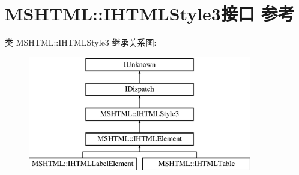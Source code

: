 \hypertarget{interface_m_s_h_t_m_l_1_1_i_h_t_m_l_style3}{}\section{M\+S\+H\+T\+ML\+:\+:I\+H\+T\+M\+L\+Style3接口 参考}
\label{interface_m_s_h_t_m_l_1_1_i_h_t_m_l_style3}
类 M\+S\+H\+T\+ML\+:\+:I\+H\+T\+M\+L\+Style3 继承关系图\+:\begin{figure}[H]
\begin{center}
\leavevmode
\includegraphics[height=5.000000cm]{interface_m_s_h_t_m_l_1_1_i_h_t_m_l_style3}
\end{center}
\end{figure}

